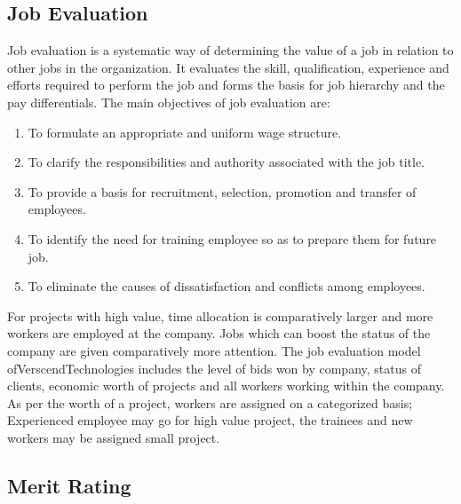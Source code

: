 \subsection{Job Evaluation}
Job evaluation is a systematic way of determining the value of a job in relation to other jobs in the organization.
It evaluates the skill, qualification, experience and efforts required to perform the job and forms the basis for
job hierarchy and the pay differentials.
The main objectives of job evaluation are:
\begin{enumerate}
\item  To formulate an appropriate and uniform wage structure.
\item  To clarify the responsibilities and authority associated with the job title.
\item  To provide a basis for recruitment, selection, promotion and transfer of employees.
\item  To identify the need for training employee so as to prepare them for future job.
\item  To eliminate the causes of dissatisfaction and conflicts among employees.
\end{enumerate}
For projects with high value, time allocation is comparatively larger and more workers are employed at the
company. Jobs which can boost the status of the company are given comparatively more attention. The job
evaluation model ofVerscendTechnologies includes the level of bids won by company, status of
clients, economic worth of projects and all workers working within the company. As per the worth of a project,
workers are assigned on a categorized basis; Experienced employee may go for high value project, the trainees
and new workers may be assigned small project.
\subsection{Merit Rating}
